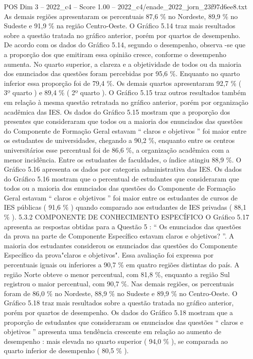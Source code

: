 \begin{textsample}{POS Dim 3 – 2022\_c4 – Score 1.00 – 2022\_c4/enade\_2022\_jorn\_23f97d6ee8.txt}
As demais regiões apresentaram os percentuais 87,6 \% no Nordeste, 89,9 \% no Sudeste e 91,9 \% na região Centro-Oeste.
O Gráfico 5.14 traz mais resultados sobre a questão tratada no gráfico anterior, porém por quartos de desempenho.
De acordo com os dados do Gráfico 5.14, segundo o desempenho, observa -se que a proporção dos que emitiram essa opinião cresce, conforme o desempenho aumenta.
No quarto superior, a clareza e a objetividade de todos ou da maioria dos enunciados das questões foram percebidas por 95,6 \%.
Enquanto no quarto inferior essa proporção foi de 79,4 \%.
Os demais quartos apresentaram 92,7 \% ( 3º quarto ) e 89,4 \% ( 2º quarto ).
O Gráfico 5.15 traz outros resultados também em relação à mesma questão retratada no gráfico anterior, porém por organização acadêmica das IES.
Os dados do Gráfico 5.15 mostram que a proporção dos presentes que consideraram que todos ou a maioria dos enunciados das questões do Componente de Formação Geral estavam “ claros e objetivos ” foi maior entre os estudantes de universidades, chegando a 90,2 \%, enquanto entre os centros universitários esse percentual foi de 86,6 \%, a organização acadêmica com a menor incidência.
Entre os estudantes de faculdades, o índice atingiu 88,9 \%.
O Gráfico 5.16 apresenta os dados por categoria administrativa das IES.
Os dados do Gráfico 5.16 mostram que o percentual de estudantes que consideraram que todos ou a maioria dos enunciados das questões do Componente de Formação Geral estavam “ claros e objetivos ” foi maior entre os estudantes de cursos de IES públicas ( 91,6 \% ) quando comparado aos estudantes de IES privadas ( 88,1 \% ). 5.3.2 COMPONENTE DE CONHECIMENTO ESPECÍFICO O Gráfico 5.17 apresenta as respostas obtidas para a Questão 5 : “ Os enunciados das questões da prova na parte de Componente Específico estavam claros e objetivos? ”.
A maioria dos estudantes considerou os enunciados das questões do Componente Específico da prova"claros e objetivos".
Essa avaliação foi expressa por percentuais iguais ou inferiores a 90,7 \% em quatro regiões distintas do país.
A região Norte obteve o menor percentual, com 81,8 \%, enquanto a região Sul registrou o maior percentual, com 90,7 \%.
Nas demais regiões, os percentuais foram de 86,0 \% no Nordeste, 88,9 \% no Sudeste e 89,9 \% no Centro-Oeste.
O Gráfico 5.18 traz mais resultados sobre a questão tratada no gráfico anterior, porém por quartos de desempenho.
Os dados do Gráfico 5.18 mostram que a proporção de estudantes que consideraram os enunciados das questões “ claros e objetivos ” apresenta uma tendência crescente em relação ao aumento de desempenho : mais elevada no quarto superior ( 94,0 \% ), se comparada ao quarto inferior de desempenho ( 80,5 \% ).

\end{textsample}
